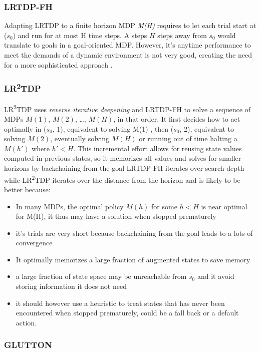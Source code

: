 \documentclass[runningheads,a4paper]{llncs}
\begin{document}
\subsubsection{LRTDP-FH}

Adapting LRTDP to a finite horizon MDP \emph{M(H)} requires to let each trial start at ($s_0$) and run for at most H time steps. A steps $H$ steps away from $s_0$ would translate to goals in a goal-oriented MDP. However, it's anytime performance to meet the demands of a dynamic environment is not very good, creating the need for a more sophisticated approach \cite{kolobov2012glutton}.

\subsubsection{LR\textsuperscript{2}TDP}

LR\textsuperscript{2}TDP uses \emph{reverse iterative deepening} and LRTDP-FH to solve a sequence of MDPs $M(1)$, $M(2)$, \ldots , $M(H)$, in that order. It first decides how to act optimally in ($s_0$, 1), equivalent to solving M(1) , then ($s_0$, 2), equivalent to solving $M(2)$, eventually solving $M(H)$ or running out of time halting a $M(h')$ where $h' < H$. This incremental effort allows for reusing state values computed in previous states, so it memorizes all values and solves for smaller horizons by backchaining from the goal LRTDP-FH iterates over search depth while LR\textsuperscript{2}TDP iterates over the distance from the horizon and is likely to be better because:

\begin{itemize}
	\item In many MDPs, the optimal policy $M(h)$ for some $h < H$ is near optimal for M(H), it thus may have a solution when stopped prematurely
	\item it's trials are very short because backchaining from the goal leads to a lots of convergence
	\item It optimally memorizes a large fraction of augmented states to save memory
	\item a large fraction of state space may be unreachable from $s_0$ and it avoid storing information it does not need
	\item it should however use a heuristic to treat states that has never been encountered when stopped prematurely, could be a fall back or a default action.
\end{itemize}

\subsubsection{GLUTTON}
\end{document}
